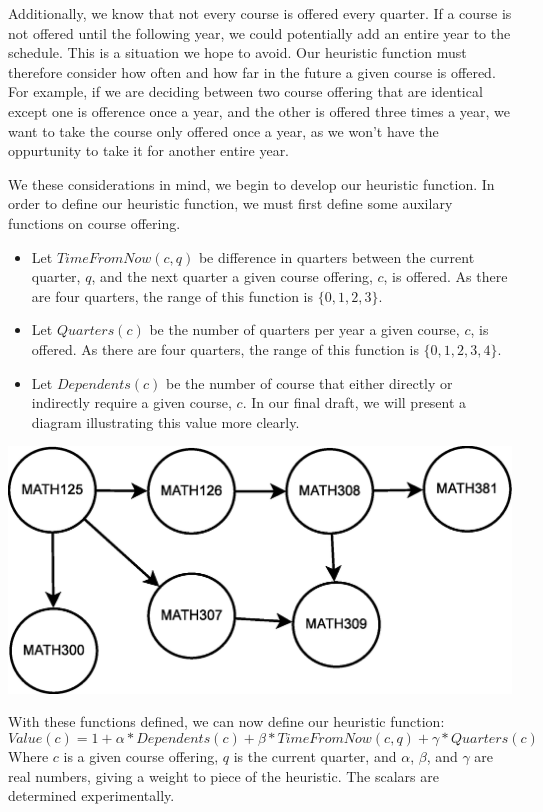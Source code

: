 \documentclass[11pt]{article} %
\begin{document}
Additionally, we know that not every course is offered every quarter. If a course is not offered until the following year, we 
could potentially add an entire year to the schedule. This is a situation we hope to avoid. Our heuristic function must 
therefore consider how often and how far in the future a given course is offered. For example, if we are deciding between 
two course offering that are identical except one is ofference once a year, and the other is offered three times a year, we 
want to take the course only offered once a year, as we won't have the oppurtunity to take it for another entire year.

We these considerations in mind, we begin to develop our heuristic function. In order to define our heuristic function, we 
must first define some auxilary functions on course offering.
\begin{itemize}
\item Let $TimeFromNow(c, q)$ be difference in quarters between the current quarter, $q$, and the next quarter a given course offering, $c$, is offered. As there are four quarters, the range of this function is $\{0, 1, 2, 3\}$.
\item Let $Quarters(c)$ be the number of quarters per year a given course, $c$, is offered. As there are four quarters, the range of this function is $\{0, 1, 2, 3, 4\}$.
\item Let $Dependents(c)$ be the number of course that either directly or indirectly require a given course, $c$. In our final 
draft, we will present a diagram illustrating this value more clearly.
\end{itemize}

\includegraphics{more_prereq_tree}

With these functions defined, we can now define our heuristic function:
\begin{equation}
Value(c) = 1 + \alpha * Dependents(c) + \beta * TimeFromNow(c, q) + \gamma * Quarters(c)
\end{equation}
Where $c$ is a given course offering, $q$ is the current quarter, and $\alpha$, $\beta$, and $\gamma$ are real numbers, giving a 
weight to piece of the heuristic. The scalars are determined experimentally.
\end{document}
